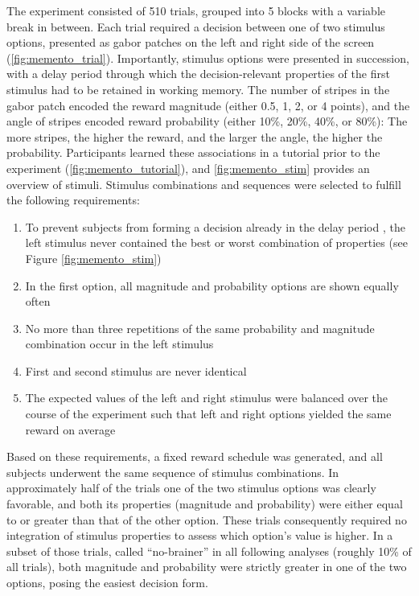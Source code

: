 The experiment consisted of 510 trials, grouped into 5 blocks with a variable break in between.
Each trial required a decision between one of two stimulus options, presented as gabor patches on the left and right side of the screen (\cref{fig:memento_trial}).
Importantly, stimulus options were presented in succession, with a delay period through which the decision-relevant properties of the first stimulus had to be retained in working memory.
The number of stripes in the gabor patch encoded the reward magnitude (either 0.5, 1, 2, or 4 points), and the angle of stripes encoded reward probability (either 10\%, 20\%, 40\%, or 80\%): The more stripes, the higher the reward, and the larger the angle, the higher the probability.
Participants learned these associations in a tutorial prior to the experiment (\cref{fig:memento_tutorial}), and \cref{fig:memento_stim} provides an overview of stimuli.
Stimulus combinations and sequences were selected to fulfill the following requirements:
\begin{enumerate}
	\item To prevent subjects from forming a decision already in the delay period \citep{curtis2010beyond}, the left stimulus never contained the best or worst combination of properties (see Figure \ref{fig:memento_stim})
	\item In the first option, all magnitude and probability options are shown equally often
	\item No more than three repetitions of the same probability and magnitude combination occur in the left stimulus
	\item First and second stimulus are never identical
	\item The expected values of the left and right stimulus were balanced over the course of the experiment such that left and right options yielded the same reward on average
\end{enumerate}
Based on these requirements, a fixed reward schedule was generated, and all subjects underwent the same sequence of stimulus combinations.
In approximately half of the trials one of the two stimulus options was clearly favorable, and both its properties (magnitude and probability) were either equal to or greater than that of the other option.
These trials consequently required no integration of stimulus properties to assess which option's value is higher.
In a subset of those trials, called ``no-brainer'' in all following analyses (roughly 10\% of all trials), both magnitude and probability were strictly greater in one of the two options, posing the easiest decision form.
